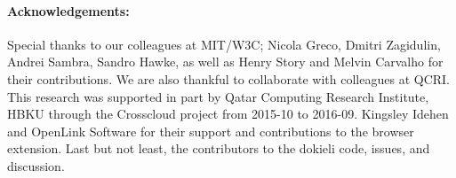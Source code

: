 \documentclass[a4paper]{llncs}
\begin{document}
                    
\paragraph{Acknowledgements:}
Special thanks to our colleagues at \empty MIT/\empty W3C; \empty Nicola Greco, \empty Dmitri Zagidulin, \empty Andrei Sambra, \empty Sandro Hawke, as well as \empty Henry Story and \empty Melvin Carvalho for their contributions. We are also thankful to collaborate with colleagues at \empty QCRI. This research was supported in part by \empty Qatar Computing Research Institute, \empty HBKU through the \empty Crosscloud project from 2015-10 to 2016-09. \empty Kingsley Idehen and \empty OpenLink Software for their support and contributions to the browser extension. Last but not least, the contributors to the dokieli code, issues, and discussion.
                        
                    

                    
                        
\end{document}
